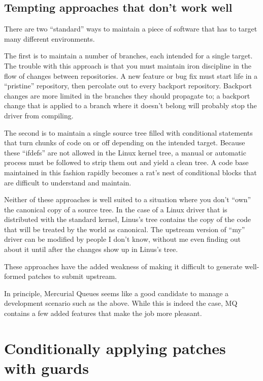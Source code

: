 \subsection{Tempting approaches that don't work well}

There are two ``standard'' ways to maintain a piece of software that
has to target many different environments.

The first is to maintain a number of branches, each intended for a
single target.  The trouble with this approach is that you must
maintain iron discipline in the flow of changes between repositories.
A new feature or bug fix must start life in a ``pristine'' repository,
then percolate out to every backport repository.  Backport changes are
more limited in the branches they should propagate to; a backport
change that is applied to a branch where it doesn't belong will
probably stop the driver from compiling.

The second is to maintain a single source tree filled with conditional
statements that turn chunks of code on or off depending on the
intended target.  Because these ``ifdefs'' are not allowed in the
Linux kernel tree, a manual or automatic process must be followed to
strip them out and yield a clean tree.  A code base maintained in this
fashion rapidly becomes a rat's nest of conditional blocks that are
difficult to understand and maintain.

Neither of these approaches is well suited to a situation where you
don't ``own'' the canonical copy of a source tree.  In the case of a
Linux driver that is distributed with the standard kernel, Linus's
tree contains the copy of the code that will be treated by the world
as canonical.  The upstream version of ``my'' driver can be modified
by people I don't know, without me even finding out about it until
after the changes show up in Linus's tree.  

These approaches have the added weakness of making it difficult to
generate well-formed patches to submit upstream.

In principle, Mercurial Queues seems like a good candidate to manage a
development scenario such as the above.  While this is indeed the
case, MQ contains a few added features that make the job more
pleasant.

\section{Conditionally applying patches with 
  guards}

